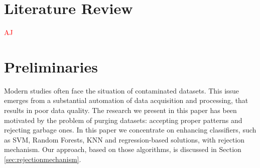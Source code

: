 \documentclass{llncs}
\begin{document}
\section{Literature Review}
  \label{sec:Literature Review}
\textcolor{red} {AJ}



\section{Preliminaries}
  \label{sec:preliminaries}
  
  
  

Modern studies often face the situation of contaminated datasets. This issue emerges from a substantial automation of data acquisition and processing, that results in poor data quality. The research we present in this paper has been motivated by the problem of purging datasets: accepting proper patterns and rejecting garbage ones. In this paper we concentrate on enhancing classifiers, such as SVM, Random Forests, KNN and regression-based solutions, with rejection mechanism. Our approach, based on those algorithms, is discussed in Section \ref{sec:rejectionmechanism}. \\
\end{document}
